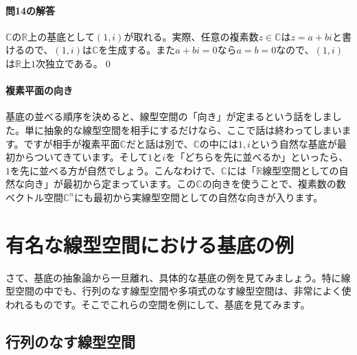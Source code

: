 \paragraph{問14の解答}
$\mathbb{C}$の$\mathbb{R}$上の基底として$(1, i)$が取れる。実際、任意の複素数$z\in\mathbb{C}$は$z = a + bi$と書けるので、$(1, i)$は$\mathbb{C}$を生成する。また$a + bi = 0$なら$a = b = 0$なので、$(1, i)$は$\mathbb{R}$上$1$次独立である。\qed


\paragraph{複素平面の向き}

基底の並べる順序を決めると、線型空間の「向き」が定まるという話をしました。単に抽象的な線型空間を相手にするだけなら、ここで話は終わってしまいます。ですが相手が複素平面$\mathbb{C}$だと話は別で、$\mathbb{C}$の中には$1, i$という自然な基底が最初からついてきています。そして$1$と$i$を「どちらを先に並べるか」といったら、$1$を先に並べる方が自然でしょう。こんなわけで、$\mathbb{C}$には「$\mathbb{R}$線型空間としての自然な向き」が最初から定まっています。この$\mathbb{C}$の向きを使うことで、複素数の数ベクトル空間$\mathbb{C}^n$にも最初から実線型空間としての自然な向きが入ります。

\section{有名な線型空間における基底の例}

さて、基底の抽象論から一旦離れ、具体的な基底の例を見てみましょう。特に線型空間の中でも、行列のなす線型空間や多項式のなす線型空間は、非常によく使われるものです。そこでこれらの空間を例にして、基底を見てみます。

\subsection{行列のなす線型空間}

